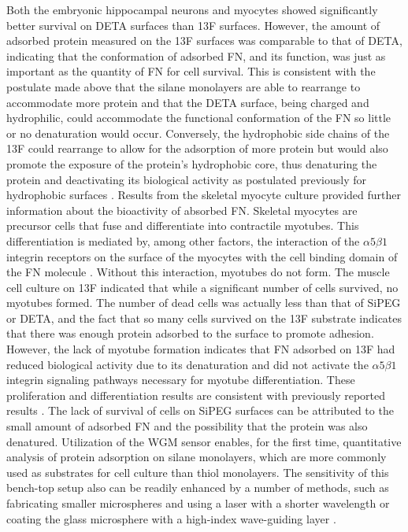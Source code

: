 Both the embryonic hippocampal neurons and myocytes showed significantly
better survival on DETA surfaces than 13F surfaces. However, the amount
of adsorbed protein measured on the 13F surfaces was comparable to
that of DETA, indicating that the conformation of adsorbed FN, and
its function, was just as important as the quantity of FN for cell
survival. This is consistent with the postulate made above that the
silane monolayers are able to rearrange to accommodate more protein
and that the DETA surface, being charged and hydrophilic, could accommodate
the functional conformation of the FN so little or no denaturation
would occur. Conversely, the hydrophobic side chains of the 13F could
rearrange to allow for the adsorption of more protein but would also
promote the exposure of the protein's hydrophobic core, thus denaturing
the protein and deactivating its biological activity as postulated
previously for hydrophobic surfaces \cite{Keselowsky2003}. Results
from the skeletal myocyte culture provided further information about
the bioactivity of absorbed FN. Skeletal myocytes are precursor cells
that fuse and differentiate into contractile myotubes. This differentiation
is mediated by, among other factors, the interaction of the $\alpha5\beta1$
integrin receptors on the surface of the myocytes with the cell binding
domain of the FN molecule \cite{Michael2003}. Without this interaction,
myotubes do not form. The muscle cell culture on 13F indicated that
while a significant number of cells survived, no myotubes formed.
The number of dead cells was actually less than that of SiPEG or DETA,
and the fact that so many cells survived on the 13F substrate indicates
that there was enough protein adsorbed to the surface to promote adhesion.
However, the lack of myotube formation indicates that FN adsorbed
on 13F had reduced biological activity due to its denaturation and
did not activate the $\alpha5\beta1$ integrin signaling pathways
necessary for myotube differentiation. These proliferation and differentiation
results are consistent with previously reported results \cite{Michael2003}.
The lack of survival of cells on SiPEG surfaces can be attributed
to the small amount of adsorbed FN and the possibility that the protein
was also denatured. Utilization of the WGM sensor enables, for the
first time, quantitative analysis of protein adsorption on silane
monolayers, which are more commonly used as substrates for cell culture
than thiol monolayers. The sensitivity of this bench-top setup also
can be readily enhanced by a number of methods, such as fabricating
smaller microspheres and using a laser with a shorter wavelength \cite{Vollmer2008a}
or coating the glass microsphere with a high-index wave-guiding layer
\cite{Teraoka2006}. 

